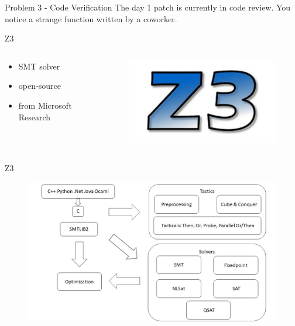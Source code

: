 \documentclass[t, ]{beamer}
\begin{document}
\begin{frame}{Problem 3 - Code Verification}
	The day 1 patch is currently in code review. You notice a strange function written by a coworker.
	
\end{frame}


\begin{frame}{Z3}
	\begin{columns}
		\begin{column}{0.5\textwidth}
			\begin{itemize}
				\item SMT solver
				\item open-source
				\item from Microsoft Research
			\end{itemize}
		\end{column}
		\begin{column}{0.5\textwidth}
			\begin{figure}
				\includegraphics[scale=0.3]{../Images/z3logo.png}
			\end{figure}
		\end{column}
		
	\end{columns}
	
\end{frame}

\begin{frame}{Z3}
	\begin{figure}
		\includegraphics[scale=0.4]{z3intern.jpg}
	\end{figure}
\end{frame}
\end{document}
